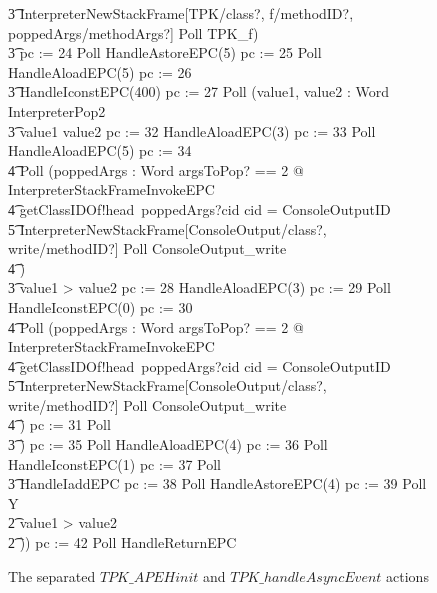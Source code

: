 \begin{figure}[tp!]
{\begin{circus}
    \t3 \lschexpract InterpreterNewStackFrame[TPK/class?, f/methodID?, poppedArgs/methodArgs?] \rschexpract \circseq Poll \circseq TPK\_f) \circseq \\
    \t3 pc := 24 \circseq Poll \circseq HandleAstoreEPC(5) \circseq pc := 25 \circseq Poll \circseq HandleAloadEPC(5) \circseq pc := 26 \circseq \\
    \t3 HandleIconstEPC(400) \circseq pc := 27 \circseq Poll \circseq (\circvar value1, value2 : Word \circspot InterpreterPop2 \circseq \\
    \t3 \circif value1 \leq value2 \circthen pc := 32 \circseq HandleAloadEPC(3) \circseq pc := 33 \circseq Poll \circseq HandleAloadEPC(5) \circseq pc := 34 \circseq \\
    \t4 Poll \circseq (\circvar poppedArgs : Word \circspot \lschexpract \exists argsToPop? == 2 @ InterpreterStackFrameInvokeEPC \rschexpract \circseq \\
    \t4 getClassIDOf!head~poppedArgs?cid \then \circif cid = ConsoleOutputID \circthen {} \\
    \t5 \lschexpract InterpreterNewStackFrame[ConsoleOutput/class?, write/methodID?] \rschexpract \circseq  Poll \circseq ConsoleOutput\_write \\
    \t4 \circfi) \\
    \t3 {} \circelse value1 > value2 \circthen pc := 28 \circseq HandleAloadEPC(3) \circseq pc := 29 \circseq Poll \circseq HandleIconstEPC(0) \circseq pc := 30 \circseq \\
    \t4 Poll \circseq (\circvar poppedArgs : Word \circspot \lschexpract \exists argsToPop? == 2 @ InterpreterStackFrameInvokeEPC \rschexpract \circseq \\
    \t4 getClassIDOf!head~poppedArgs?cid \then \circif cid = ConsoleOutputID \circthen {} \\
    \t5 \lschexpract InterpreterNewStackFrame[ConsoleOutput/class?, write/methodID?] \rschexpract \circseq  Poll \circseq ConsoleOutput\_write \\
    \t4 \circfi) \circseq pc := 31 \circseq Poll \\
    \t3 \circfi) \circseq pc := 35 \circseq Poll \circseq HandleAloadEPC(4) \circseq pc := 36 \circseq Poll \circseq HandleIconstEPC(1) \circseq pc := 37 \circseq Poll \circseq \\
    \t3 HandleIaddEPC \circseq pc := 38 \circseq Poll \circseq HandleAstoreEPC(4) \circseq pc := 39 \circseq Poll \circseq Y \\
    \t2 {} \circelse value1 > value2 \circthen \Skip \\
    \t2 \circfi)) \circseq pc := 42 \circseq Poll \circseq HandleReturnEPC \\
  \end{circus}
  }
  \caption{The separated $TPK\_APEHinit$ and $TPK\_handleAsyncEvent$ actions}
  \label{method-separation-handleAsyncEvent-example-figure}
\end{figure}

